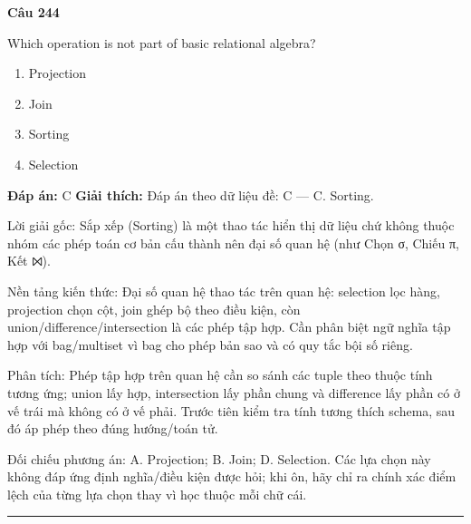 \documentclass[11pt,a4paper]{article}
\newenvironment{question}[1]{%
  \par\vspace{1em}\noindent\textbf{\large Câu #1}\par\vspace{0.4em}
}{%
  \par\vspace{1em}\hrule\vspace{0.6em}
}
\newenvironment{choices}{%
  \begin{enumerate}[label=\textbf{\Alph*.},leftmargin=2.2em,itemsep=2pt,topsep=3pt]
}{%
  \end{enumerate}
}
\newcommand{\choice}{\item}
\begin{document}
\begin{question}{244}
Which operation is not part of basic relational algebra?
\begin{choices}
\choice Projection
\choice Join
\choice Sorting
\choice Selection
\end{choices}
\textbf{Đáp án:} C
\textbf{Giải thích:} Đáp án theo dữ liệu đề: C — C. Sorting.

Lời giải gốc: Sắp xếp (Sorting) là một thao tác hiển thị dữ liệu chứ không thuộc nhóm các phép toán cơ bản cấu thành nên đại số quan hệ (như Chọn σ, Chiếu π, Kết ⨝).

Nền tảng kiến thức: Đại số quan hệ thao tác trên quan hệ: selection lọc hàng, projection chọn cột, join ghép bộ theo điều kiện, còn union/difference/intersection là các phép tập hợp. Cần phân biệt ngữ nghĩa tập hợp với bag/multiset vì bag cho phép bản sao và có quy tắc bội số riêng.

Phân tích: Phép tập hợp trên quan hệ cần so sánh các tuple theo thuộc tính tương ứng; union lấy hợp, intersection lấy phần chung và difference lấy phần có ở vế trái mà không có ở vế phải. Trước tiên kiểm tra tính tương thích schema, sau đó áp phép theo đúng hướng/toán tử.

Đối chiếu phương án: A. Projection; B. Join; D. Selection. Các lựa chọn này không đáp ứng định nghĩa/điều kiện được hỏi; khi ôn, hãy chỉ ra chính xác điểm lệch của từng lựa chọn thay vì học thuộc mỗi chữ cái.
\end{question}
\end{document}
